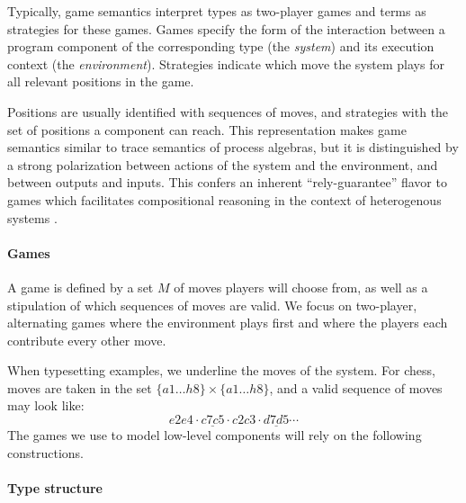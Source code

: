 \documentclass[acmsmall,authordraft]{acmart}
\newcommand{\kw}[1]{\ensuremath{ \mathsf{#1} }}
\newcommand{\que}{\circ}
\newcommand{\ans}{\bullet}
\begin{document}
Typically,
game semantics interpret
types as two-player games
and terms as strategies for these games.
Games specify the form of the interaction
between a program component of the corresponding type
(the \emph{system})
and its execution context
(the \emph{environment}).
Strategies
indicate which move the system plays
for all relevant positions in the game.

Positions are usually identified with sequences of moves,
and strategies with the set of positions
a component can reach.
This representation makes
game semantics similar to
trace semantics of process algebras,
but it is distinguished
by a strong polarization between
actions of the system and the environment,
and between outputs and inputs.
This confers an inherent ``rely-guarantee'' flavor
to games which facilitates compositional reasoning
in the context of heterogenous systems \cite{cspgs}.


\paragraph{Games} \label{sec:mainideas:gs:games} %

A game is defined by a set $M$ of moves
players will choose from,
as well as a stipulation of which
sequences of moves are valid.
We focus on two-player, alternating games
where the environment plays first and
where the players
each contribute every other move.

When typesetting examples,
we underline the moves of the system.
For chess,
moves are taken in the set $\{a1 \ldots h8\} \times \{a1 \ldots h8\}$,
and a valid sequence of moves may look like:
\[ e2e4 \cdot \underline{c7c5} \cdot c2c3 \cdot \underline{d7d5} \cdots \]
The games we use to model low-level components
will rely on the following constructions.



\paragraph{Type structure} \label{sec:mainideas:gs:types} %
\end{document}
